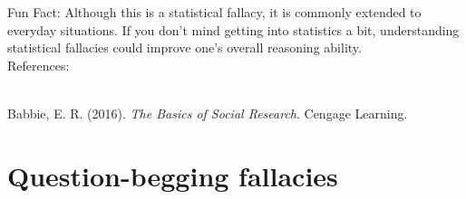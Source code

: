 \documentclass[a4paper,12pt,single,pdftex]{scrbook}
\begin{document}
    
      Fun Fact: Although this is a statistical fallacy, it is commonly extended to everyday situations. If you don't mind getting into statistics a bit, understanding statistical fallacies could improve one's overall reasoning ability.
    \\

    References:

    
      
        
      \\

      
        
          Babbie, E. R. (2016). {\it The Basics of Social Research}. Cengage Learning.
        
      
    
  \chapter{Question-begging fallacies}
\end{document}

